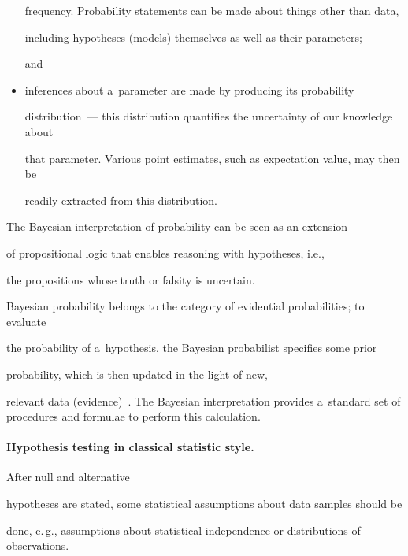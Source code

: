 \begin{multicols}{2}
\begin{itemize}
frequency. Probability statements can be made about things other than data,


including hypotheses (models) themselves as well as their parameters;


and


\item inferences about a~parameter are made by producing its probability


distribution~--- this distribution quantifies the uncertainty of our knowledge about


that parameter. Various point estimates, such as expectation value, may then be


readily extracted from this distribution.


\end{itemize}





  The Bayesian interpretation of probability can be seen as an extension


of propositional logic that enables reasoning with hypotheses, i.e.,


the propositions whose truth or falsity is uncertain.





  Bayesian probability belongs to the category of evidential probabilities; to evaluate


the probability of a~hypothesis, the Bayesian probabilist specifies some prior


probability, which is then updated in the light of new,


relevant data (evidence)~\cite{28-kl}. The Bayesian interpretation provides a~standard set of procedures and formulae to perform this calculation.





\vspace*{-6pt}





  \paragraph*{Hypothesis testing in classical statistic style.} After null and alternative


hypotheses are stated, some statistical assumptions about data samples should be


done, e.\,g., assumptions about statistical independence or distributions of observations.



\end{multicols}
